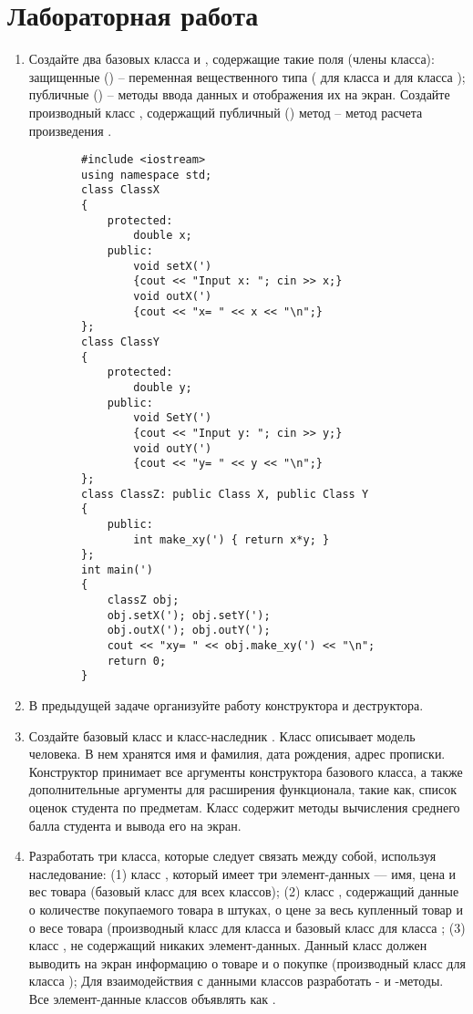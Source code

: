 \section{Лабораторная работа}
\begin{enumerate}[leftmargin=*]
    \item Создайте два базовых класса  и , содержащие такие поля (члены класса): защищенные () – переменная вещественного типа ( для класса  и  для класса ); публичные () – методы ввода данных и отображения их на экран. Создайте производный класс ,  содержащий публичный () метод – метод расчета произведения .
    \begin{lstlisting}
        #include <iostream>
        using namespace std;
        class ClassX
        {
            protected:
                double x;
            public:
                void setX(')
                {cout << "Input x: "; cin >> x;}
                void outX(')
                {cout << "x= " << x << "\n";}
        };
        class ClassY
        {
            protected:
                double y;
            public:
                void SetY(')
                {cout << "Input y: "; cin >> y;}
                void outY(')
                {cout << "y= " << y << "\n";}
        };
        class ClassZ: public Class X, public Class Y
        {
            public:
                int make_xy(') { return x*y; }
        };
        int main(')
        {
            classZ obj;
            obj.setX('); obj.setY(');
            obj.outX('); obj.outY(');
            cout << "xy= " << obj.make_xy(') << "\n";
            return 0;
        }
    \end{lstlisting}
    \item В предыдущей задаче организуйте работу конструктора и деструктора.
    \item Создайте базовый класс  и класс-наследник . Класс  описывает модель человека. В нем хранятся имя и фамилия, дата рождения, адрес прописки. Конструктор  принимает все аргументы конструктора базового класса, а также дополнительные аргументы для расширения функционала, такие как, список оценок студента по предметам. Класс  содержит методы вычисления среднего балла студента и вывода его на экран.
    \item Разработать три класса, которые следует связать между собой, используя наследование: (1) класс , который имеет три элемент-данных — имя, цена и вес товара (базовый класс для всех классов); (2) класс  , содержащий данные о количестве покупаемого товара в штуках, о цене за весь купленный товар и  о весе товара (производный класс для класса  и базовый класс для класса ; (3) класс , не содержащий никаких элемент-данных. Данный класс должен выводить на экран информацию о товаре и о покупке (производный класс для класса ); Для взаимодействия с данными классов разработать - и -методы. Все элемент-данные классов объявлять как .
\end{enumerate}

